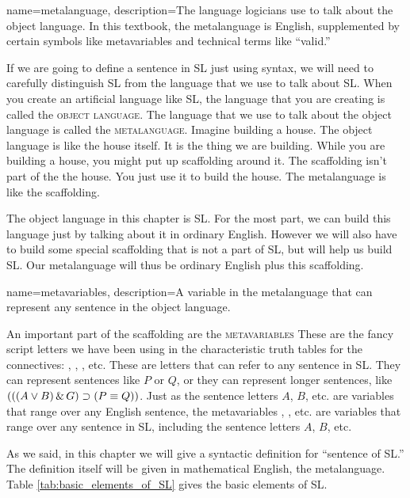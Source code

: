 {
name=metalanguage,
description={The language logicians use to talk about the object language. In this textbook, the metalanguage is English, supplemented by certain symbols like metavariables and technical terms like ``valid.''}
}

If we are going to define a sentence in SL just using syntax, we will need to carefully distinguish SL from the language that we use to talk about SL. When you create an artificial language like SL, the language that you are creating is called the \textsc{\gls{object language}}. \label{def:object_language} The language that we use to talk about the object language is called the \textsc{\gls{metalanguage}}. \label{def:metalanguage} Imagine building a house. The object language is like the house itself. It is the thing we are building. While you are building a house, you might put up scaffolding around it. The scaffolding isn't part of the the house. You just use it to build the house. The metalanguage is like the scaffolding. 

The object language in this chapter is SL. For the most part, we can build this language just by talking about it in ordinary English. However we will also have to build some special scaffolding that is not a part of SL, but will help us build SL. Our metalanguage will thus be ordinary English plus this scaffolding.

{
name=metavariables,
description={A variable in the metalanguage that can represent any sentence in the object language.}
}



An important part of the scaffolding are the \textsc{\gls{metavariables}} \label{def:metavariables} These are the fancy script letters we have been using in the characteristic truth tables for the connectives: , , , etc. These are letters that can refer to any sentence in SL. They can represent sentences like $P$ or $Q$, or they can represent longer sentences, like $(((A \vee B) \,\&\, G) \supset (P \equiv Q))$. Just as the sentence letters $A$, $B$, etc. are variables that range over any English sentence, the metavariables , , etc. are variables that range over any sentence in SL, including the sentence letters $A$, $B$, etc. 

As we said, in this chapter we will give a syntactic definition for ``sentence of SL.'' The definition itself will be given in mathematical English, the metalanguage. Table \ref{tab:basic_elements_of_SL} gives the basic elements of SL.


